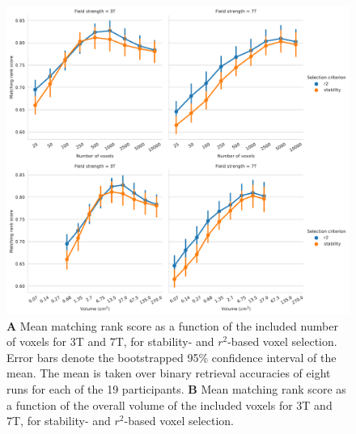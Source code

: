 \begin{figure}
  \centering
    \includegraphics[width=\linewidth]{pics/rank_selection.pdf}
	
  \caption{\textbf{A} Mean matching rank score as a function of the included number
  of voxels for 3T and 7T, for stability- and $r^2$-based voxel selection.
  Error bars denote the bootstrapped 95\% confidence interval of the mean. The
  mean is taken over binary retrieval accuracies of eight runs for each of the
  19 participants. \textbf{B} Mean matching rank score as a function of the overall
volume of the included voxels for 3T and 7T, for stability- and
$r^2$-based voxel selection.}

 \label{fig:matching_score_selection}
\end{figure}


